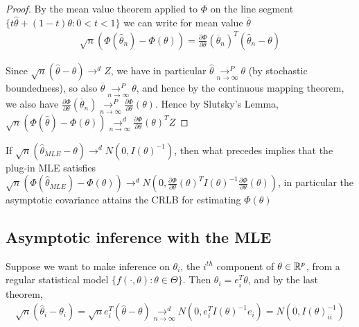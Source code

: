 \documentclass[a4paper]{article}
\begin{document}
\begin{proof}
	By the mean value theorem applied to $\Phi$ on the line segment $\{t \hat{\theta} + (1-t)\theta : 0<t<1\} $ we can write for mean value $\overline{\theta}$
	\begin{align*}
		\sqrt{n}(\Phi(\hat{\theta}_n) - \Phi(\theta)) = \frac{\partial\Phi}{\partial\theta}(\overline{\theta}_n)^{T}(\hat{\theta}_n - \theta)
	\end{align*}

	Since $\sqrt{n}(\hat{\theta} - \theta) \to ^{d} Z $, we have in particular $\hat{\theta} \underset{n\to \infty}{\to ^{P}} \theta$ (by stochastic boundedness), so also $\overline{\theta} \underset{n\to \infty}{\to ^{P}} \theta$, and hence by the continuous mapping theorem, we also have $\frac{\partial\Phi}{\partial\theta}(\overline{\theta}_n) \underset{n\to \infty}{\to ^{P}} \frac{\partial\Phi}{\partial\theta} (\theta)$. Hence by Slutsky's Lemma, $\sqrt{n}(\Phi(\hat{\theta}) - \Phi(\theta)) \underset{n\to \infty}{\to ^{d}} \frac{\partial\Phi}{\partial\theta}(\theta)^{T} Z$ 
	
\end{proof}

\begin{remark}
	If $\sqrt{n}( \hat{\theta}_{MLE} - \theta) \to ^{d} N(0, I(\theta)^{-1})$, then what precedes implies that the plug-in MLE satisfies $\sqrt{n} (\Phi(\hat{\theta}_{MLE}) - \Phi(\theta)) \to ^{d} N\left(0, \frac{\partial\Phi}{\partial\theta}(\theta)^{T} I(\theta)^{-1} \frac{\partial\Phi}{\partial\theta}(\theta)\right)$, in particular the asymptotic covariance attains the CRLB for estimating $\Phi(\theta)$
	
\end{remark}

\subsection{Asymptotic inference with the MLE}

Suppose we want to make inference on $\theta_i$, the $i^{th}$ component of $\theta \in \mathbb{R}^{p}$, from a regular statistical model $\{f\left( \cdot , \theta \right) : \theta \in \Theta \}$. Then $\theta_i = e_i ^{T} \theta$, and by the last theorem,
\begin{align*}
	\sqrt{n} (\hat{\theta}_i - \theta_i) = \sqrt{n} e_i ^{T} (\hat{\theta} - \theta) \underset{n\to \infty}{\to ^{d}} N(0, e_i ^{T} I(\theta)^{-1} e_i) = N(0, I(\theta)^{-1}_{ii})  
\end{align*}
\end{document}
